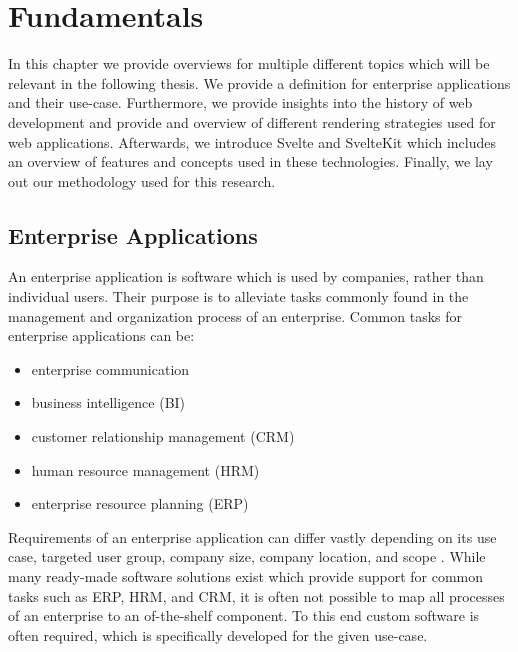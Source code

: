 \chapter{Fundamentals}
\label{ch:fundamentals}
In this chapter we provide overviews for multiple different topics which will be relevant in the following thesis. We provide a definition for enterprise applications and their use-case. Furthermore, we provide insights into the history of web development and provide and overview of different rendering strategies used for web applications. Afterwards, we introduce Svelte and SvelteKit which includes an overview of features and concepts used in these technologies. Finally, we lay out our methodology used for this research.

\section{Enterprise Applications}
\label{sec:enterprise-applications}



An enterprise application is software which is used by companies, rather than individual users. Their purpose is to alleviate tasks commonly found in the management and organization process of an enterprise. Common tasks for enterprise applications can be:
\begin{itemize}
    \item enterprise communication
    \item business intelligence (BI)
    \item customer relationship management (CRM)
    \item human resource management (HRM)
    \item enterprise resource planning (ERP)
\end{itemize}

Requirements of an enterprise application can differ vastly depending on its use case, targeted user group, company size, company location, and scope \cite{noauthor_what_nodate,beal_what_2010}. While many ready-made software solutions exist which provide support for common tasks such as ERP, HRM, and CRM, it is often not possible to map all processes of an enterprise to an of-the-shelf component. To this end custom software is often required, which is specifically developed for the given use-case.

